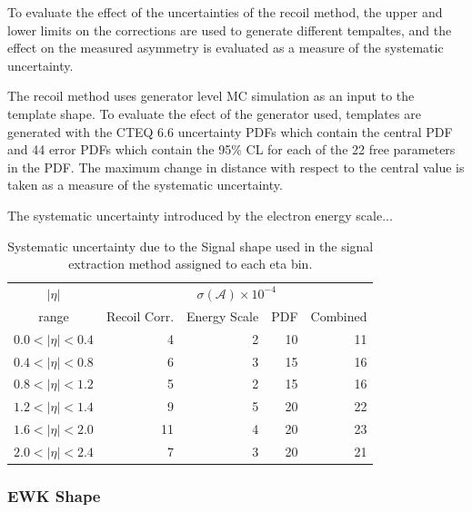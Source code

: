 To evaluate the effect of the uncertainties of the recoil method, the upper and
lower limits on the corrections are used to generate different tempaltes, and
the effect on the measured asymmetry is evaluated as a measure of the
systematic uncertainty.

The recoil method uses generator level \ac{MC} simulation as an input to the
template shape. To evaluate the efect of the generator used, templates are
generated with the CTEQ 6.6 %
uncertainty \acp{PDF} which contain the central \ac{PDF} and 44 error \acp{PDF}
which contain the \unit{95}{\%} \ac{CL} for each of the 22 free parameters in
the \ac{PDF}. The maximum change in distance with respect to the central value
is taken as a measure of the systematic uncertainty.

The systematic uncertainty introduced by the electron energy scale...



\begin{table}[htb]
\begin{center}
\begin{tabular}{crrrr}
$|\eta|$   & \multicolumn{4}{c}{$\sigma(\mathcal{A}) \times 10^{-4}$}\\
range      & Recoil Corr. & Energy Scale & PDF & Combined \\
\hline
$0.0<|\eta|<0.4$ &  4 & 2 & 10  & 11 \\
$0.4<|\eta|<0.8$ &  6 & 3 & 15  & 16 \\
$0.8<|\eta|<1.2$ &  5 & 2 & 15  & 16 \\
$1.2<|\eta|<1.4$ &  9 & 5 & 20  & 22 \\
$1.6<|\eta|<2.0$ & 11 & 4 & 20  & 23 \\
$2.0<|\eta|<2.4$ &  7 & 3 & 20  & 21 \\
\end{tabular}
\caption{\label{tab:systSIG}Systematic uncertainty due to the Signal \ETm shape used in the signal
extraction method assigned to each eta bin.}
\end{center}
\end{table}

\subsubsection{\ac{EWK} \ETm Shape}

